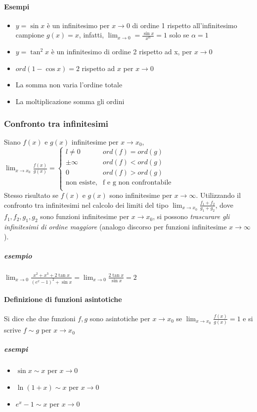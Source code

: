 \paragraph{Esempi}
\begin{itemize}
	\item $y=\sin{x}$ è un infinitesimo per $x\to 0$ di ordine 1 rispetto all'infinitesimo campione $g(x)=x$, infatti, $\lim_{x\to 0}=\frac{\sin{x}}{x^\alpha}=1$ solo se $\alpha = 1$
	\item $y=\tan^2x$ è un infinitesimo di ordine 2 rispetto ad x, per $x\to 0$
	\item $ord(1-\cos{x})=2$ rispetto ad $x$ per $x\to 0$
	\item La somma non varia l'ordine totale
	\item La moltiplicazione somma gli ordini
\end{itemize}
\subsubsection{Confronto tra infinitesimi}
Siano $f(x)$ e $g(x)$ infinitesime per $x\to x_{0}$,\\
$\lim_{x\to x_0}\frac{f(x)}{g(x)}=
\begin{cases}
l\neq 0&ord(f)=ord(g)\\
\pm \infty&ord(f)<ord(g)\\
0&ord(f)>ord(g)\\
	\text{non esiste,} & \text{f e g non confrontabile} \\ 
\end{cases}
$\\
Stesso risultato se $f(x)$ e $g(x)$ sono infinitesime per $x\to \infty$. Utilizzando il confronto tra infinitesimi nel calcolo dei limiti del tipo $\lim_{x\to x_0}\frac{f_1+f_2}{g_1+g_2}$, dove $f_1,f_2,g_1,g_2$ sono funzioni infinitesime per $x\to x_0$, si possono {\color{blue} \em trascurare gli infinitesimi di ordine maggiore} (analogo discorso per funzioni infinitesime $x\to \infty$).
\subparagraph{esempio}
$\lim_{x\to 0}\frac{x^2+x^3+2\tan{x}}{(e^x-1)^2+\sin{x}}=\lim_{x\to 0}\frac{2\tan x}{\sin x}=2$
\paragraph{Definizione di funzioni asintotiche}
Si dice che due funzioni $f,g$ sono asintotiche per $x\to x_0$ se $\lim_{x\to x_0}\frac{f(x)}{g(x)}=1$ e si scrive $f\sim g$ per $x\to x_0$
\subparagraph{esempi}
\begin{itemize}
	\item $\sin x\sim x$ per $x\to 0$
	\item $\ln(1+x)\sim x$ per $x\to 0$
	\item $e^x-1\sim x$ per $x\to 0$ 
\end{itemize}
